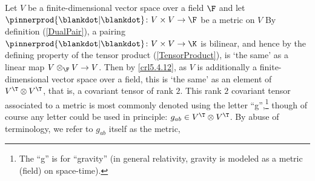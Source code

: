 Let $V$ be a finite-dimensional vector space over a field $\F$ and let $\pinnerprod{\blankdot |\blankdot}\colon V\times V\rightarrow \F$ be a metric on $V$  By definition (\cref{DualPair}), a pairing $\pinnerprod{\blankdot |\blankdot}\colon V\times V\rightarrow \K$ is bilinear, and hence by the defining property of the tensor product (\cref{TensorProduct}), is `the same' as a linear map $V\otimes _{\F}V\rightarrow V$.  Then by \cref{crl5.4.12}, as $V$ is additionally a finite-dimensional vector space over a field, this is `the same' as an element of $V^{\T}\otimes V^{\T}$, that is, a covariant tensor of rank $2$.  This rank $2$ covariant tensor associated to a metric is most commonly denoted using the letter ``g'',\footnote{The ``g'' is for ``gravity'' (in general relativity, gravity is modeled as a metric (field) on space-time).} though of course any letter could be used in principle:  $g_{ab}\in V^{\T}\otimes V^{\T}$.  By abuse of terminology, we refer to $g_{ab}$ itself as the metric, 
